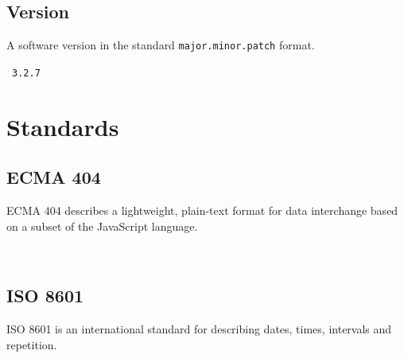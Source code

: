 \documentclass[10pt]{article}
\begin{document}
\subsection{Version}
A software version in the standard {\tt major.minor.patch} format.

\example\ {\tt 3.2.7}




%
%

\section{Standards}\label{standards}

\subsection{ECMA 404}
ECMA 404 describes a lightweight, plain-text format for data
interchange based on a subset of the JavaScript language.

\\


\subsection{ISO 8601}
ISO 8601 is an international standard for describing dates, times,
intervals and repetition.

\\
\end{document}
